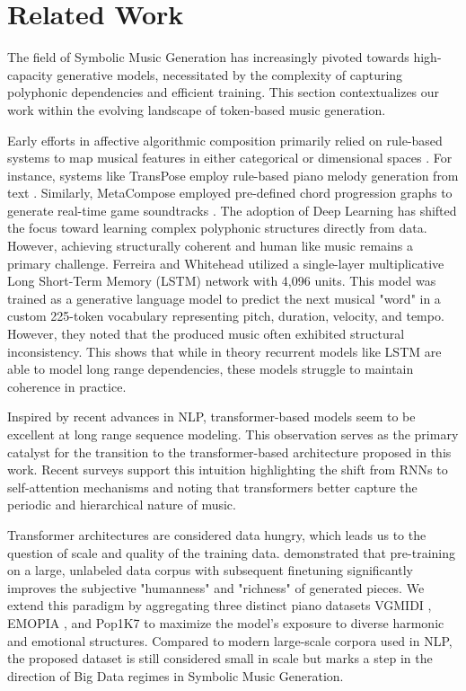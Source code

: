 \documentclass{article}
\begin{document}
\section{Related Work}\label{sec:related_work}

The field of Symbolic Music Generation has increasingly pivoted towards high-capacity generative models, 
necessitated by the complexity of capturing polyphonic dependencies and efficient training. This section 
contextualizes our work within the evolving landscape of token-based music generation. 

Early efforts in affective algorithmic composition primarily relied on rule-based systems to map 
musical features in either categorical or dimensional spaces \cite{morpheus}. For instance, systems like 
TransPose employ rule-based piano melody generation from text \cite{davis2014}. Similarly, MetaCompose 
employed pre-defined chord progression graphs to generate real-time game soundtracks \cite{Scirea}. 
The adoption of Deep Learning has shifted the focus toward learning complex polyphonic structures directly 
from data. 
However, achieving structurally coherent and human like music remains a primary challenge. 
Ferreira and Whitehead \cite{vgmidi} utilized a single-layer multiplicative Long Short-Term Memory (LSTM) 
network with 4,096 units. This model was trained as a generative language model to predict the 
next musical "word" in a custom 225-token vocabulary representing pitch, duration, velocity, and tempo. 
However, they noted that the produced music often exhibited structural inconsistency. 
This shows that while in theory recurrent models like LSTM are able to model long range dependencies,
these models struggle to maintain coherence in practice.

Inspired by recent advances in NLP, transformer-based models seem to be excellent at long range 
sequence modeling. This observation serves as the primary catalyst for the transition to 
the transformer-based architecture proposed in this work. Recent surveys support this intuition \cite{Ji2023} 
highlighting the shift from RNNs to self-attention mechanisms and noting that transformers better 
capture the periodic and hierarchical nature of music.

Transformer architectures are considered data hungry, which leads us to the question of scale and 
quality of the training data. \cite{emopia} demonstrated that pre-training on a large, unlabeled 
data corpus with subsequent finetuning significantly improves the subjective "humanness" and "richness" 
of generated pieces. We extend this paradigm by aggregating three distinct piano datasets 
VGMIDI \cite{vgmidi}, EMOPIA \cite{emopia}, and Pop1K7 \cite{compoundword} to maximize the model's exposure 
to diverse harmonic and emotional structures. Compared to modern large-scale corpora used in NLP, 
the proposed dataset is still considered small in scale but marks a step in the direction of Big Data 
regimes in Symbolic Music Generation.
\end{document}
